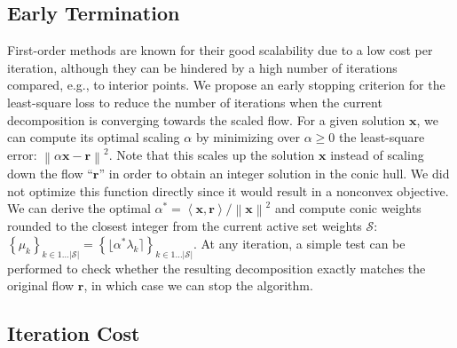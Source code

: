 \documentclass{ecai}
\newcommand{\innp}[2]{\left\langle #1, #2 \right\rangle}
\newcommand{\norm}[1]{\left\| #1 \right\|}
\newcommand{\vx}{\mathbf{x}}
\newcommand{\vr}{\mathbf{r}}
\newcommand{\Scal}{{\ensuremath{\mathcal{S}}}}
\begin{document}
\subsection{Early Termination}\label{sec:earlystop}

First-order methods are known for their good scalability due to a low cost per iteration, although they can be hindered by a high number of iterations compared, e.g., to interior points.
We propose an early stopping criterion for the least-square loss to reduce the number of iterations when the current decomposition is converging towards the scaled flow.
For a given solution $\vx$, we can compute its optimal scaling $\alpha$ by minimizing over $\alpha \geq 0$ the least-square error:
$\norm{\alpha \vx - \vr}^2$. Note that this scales up the solution $\vx$ instead of scaling down the flow ``$\vr$'' in order to obtain an integer solution in the conic hull.
We did not optimize this function directly since it would result in a nonconvex objective.
We can derive the optimal $\alpha^* = \innp{\vx}{\vr} / \norm{\vx}^{2}$ and compute conic weights rounded to the closest integer from the current active set weights $\Scal$: $\left\{\mu_k\right\}_{k \in 1\dots |\Scal|} = \left\{\lfloor \alpha^* \lambda_k \rceil\right\}_{k \in 1\dots |\Scal|}$.
At any iteration, a simple test can be performed to check whether the resulting decomposition exactly matches the original flow $\vr$, in which case we can stop the algorithm.

\subsection{Iteration Cost}
\end{document}
